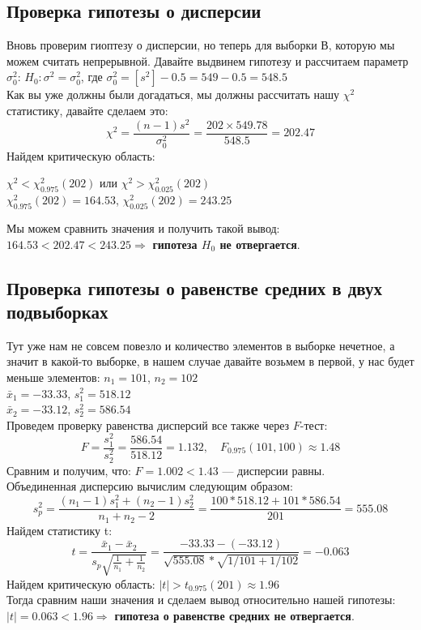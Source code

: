 \documentclass[12pt]{article}
\begin{document}
\subsection{Проверка гипотезы о дисперсии}
Вновь проверим гиоптезу о дисперсии, но теперь для выборки В, которую мы можем считать непрерывной. Давайте выдвинем гипотезу и рассчитаем параметр $\sigma_0^2$:
$H_0: \sigma^2 = \sigma_0^2$, где $\sigma_0^2 = [s^2] - 0.5 = 549 - 0.5 = 548.5$ \\
Как вы уже должны были догадаться, мы должны рассчитать нашу $\chi^2$ статистику, давайте сделаем это:
\[
\chi^2 = \frac{(n-1)s^2}{\sigma_0^2} = \frac{202 \times 549.78}{548.5} = 202.47
\]
Найдем критическую область:\\ 
\begin{centering}
$\chi^2 < \chi^2_{0.975}(202)$ или $\chi^2 > \chi^2_{0.025}(202)$ \\
\vspace{3mm}
$\chi^2_{0.975}(202) = 164.53$, $\chi^2_{0.025}(202) = 243.25$ \\
\end{centering}
\vspace{5mm}
Мы можем сравнить значения и получить такой вывод: $164.53 < 202.47 < 243.25 \Rightarrow$ \textbf{гипотеза $H_0$ не отвергается}.

\subsection{Проверка гипотезы о равенстве средних в двух подвыборках}
Тут уже нам не совсем повезло и количество элементов в выборке нечетное, а значит в какой-то выборке, в нашем случае давайте возьмем в первой, у нас будет меньше элементов:
$n_1 = 101$, $n_2 = 102$ \\
$\bar{x}_1 = -33.33$, $s_1^2 = 518.12$ \\
$\bar{x}_2 = -33.12$, $s_2^2 = 586.54$ \\
Проведем проверку равенства дисперсий все также через $F$-тест:
\[
F = \frac{s_1^2}{s_2^2} = \frac{586.54}{518.12} = 1.132, \quad F_{0.975}(101,100) \approx 1.48
\]
Сравним и получим, что:
$F = 1.002 < 1.43$ — дисперсии равны. \\
Объединенная дисперсию вычислим следующим образом:
\[
s_p^2 = \frac{(n_1-1)s_1^2 + (n_2-1)s_2^2}{n_1 + n_2 - 2} = \frac{100 * 518.12 + 101 * 586.54}{201} = 555.08
\]
Найдем статистику t:
\[
t = \frac{\bar{x}_1 - \bar{x}_2}{s_p \sqrt{\frac{1}{n_1} + \frac{1}{n_2}}} = \frac{-33.33 - (-33.12)}{\sqrt{555.08} * \sqrt{1/101 + 1/102}} = -0.063
\]
Найдем критическую область: $|t| > t_{0.975}(201) \approx 1.96$ \\
Тогда сравним наши значения и сделаем вывод относительно нашей гипотезы: $|t| = 0.063 < 1.96 \Rightarrow$ \textbf{гипотеза о равенстве средних не отвергается}.
\end{document}
